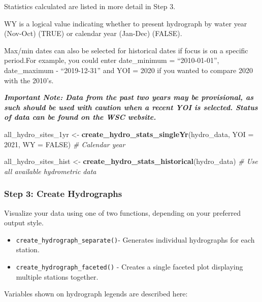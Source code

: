 \documentclass[
]{article}
\newenvironment{Shaded}{\begin{snugshade}}{\end{snugshade}}
\newcommand{\AttributeTok}[1]{\textcolor[rgb]{0.13,0.29,0.53}{#1}}
\newcommand{\CommentTok}[1]{\textcolor[rgb]{0.56,0.35,0.01}{\textit{#1}}}
\newcommand{\ConstantTok}[1]{\textcolor[rgb]{0.56,0.35,0.01}{#1}}
\newcommand{\DecValTok}[1]{\textcolor[rgb]{0.00,0.00,0.81}{#1}}
\newcommand{\FunctionTok}[1]{\textcolor[rgb]{0.13,0.29,0.53}{\textbf{#1}}}
\newcommand{\NormalTok}[1]{#1}
\newcommand{\OtherTok}[1]{\textcolor[rgb]{0.56,0.35,0.01}{#1}}
\begin{document}
Statistics calculated are listed in more detail in Step 3.

WY is a logical value indicating whether to present hydrograph by water
year (Nov-Oct) (TRUE) or calendar year (Jan-Dec) (FALSE).

Max/min dates can also be selected for historical dates if focus is on a
specific period.For example, you could enter date\_minimum =
``2010-01-01'', date\_maximum - ``2019-12-31'' and YOI = 2020 if you
wanted to compare 2020 with the 2010's.

\textbf{\emph{Important Note: Data from the past two years may be
provisional, as such should be used with caution when a recent YOI is
selected. Status of data can be found on the WSC website.}}

\begin{Shaded}
\begin{Highlighting}[]
\NormalTok{all\_hydro\_sites\_1yr }\OtherTok{\textless{}{-}} \FunctionTok{create\_hydro\_stats\_singleYr}\NormalTok{(hydro\_data, }
                                                   \AttributeTok{YOI =} \DecValTok{2021}\NormalTok{, }
                                                   \AttributeTok{WY =} \ConstantTok{FALSE}\NormalTok{) }\CommentTok{\# Calendar year}

\NormalTok{all\_hydro\_sites\_hist }\OtherTok{\textless{}{-}} \FunctionTok{create\_hydro\_stats\_historical}\NormalTok{(hydro\_data) }\CommentTok{\# Use all available hydrometric data}
\end{Highlighting}
\end{Shaded}

\hypertarget{step-3-create-hydrographs}{%
\subsubsection{Step 3: Create
Hydrographs}\label{step-3-create-hydrographs}}

Visualize your data using one of two functions, depending on your
preferred output style.

\begin{itemize}
\item
  \texttt{create\_hydrograph\_separate()}- Generates individual
  hydrographs for each station.
\item
  \texttt{create\_hydrograph\_faceted()} - Creates a single faceted plot
  displaying multiple stations together.
\end{itemize}

Variables shown on hydrograph legends are described here:
\end{document}
